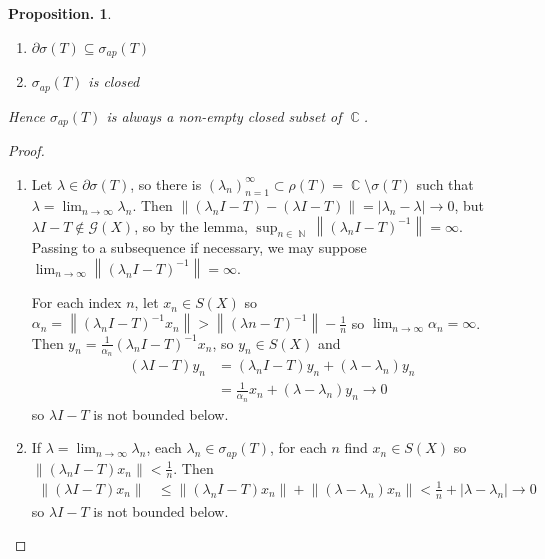 \documentclass[11pt, a4paper]{memoir}
\DeclareMathOperator{\N}{{\mathbb{N}}}
\DeclareMathOperator{\C}{{\mathbb{C}}}
\newcommand{\norm}[1]{\ensuremath{\left\lVert#1\right\rVert}}
\theoremstyle{change}
\newtheorem{proposition}[theorem]{Proposition.}
\theoremstyle{plain}
\theoremstyle{nonumberplain}
\newtheorem{proof}{Proof}
\numberwithin{equation}{section}
\begin{document}
\begin{proposition}
    \begin{enumerate}[nl,r]
        \item $\partial\sigma(T)\subseteq\sigma_{ap}(T)$
        \item $\sigma_{ap}(T)$ is closed
    \end{enumerate}
    Hence $\sigma_{ap}(T)$ is always a non-empty closed subset of $\C$.
\end{proposition}
\begin{proof}
    \begin{enumerate}[nl,r]
        \item Let $\lambda\in\partial\sigma(T)$, so there is $(\lambda_n)_{n=1}^\infty\subset\rho(T)=\C\setminus\sigma(T)$ such that $\lambda=\lim_{n\to\infty}\lambda_n$.
            Then $\norm{(\lambda_nI-T)-(\lambda I-T)}=|\lambda_n-\lambda|\to 0$, but $\lambda I-T\notin\mathcal{G}(X)$, so by the lemma, $\sup_{n\in\N}\norm{(\lambda_nI-T)^{-1}}=\infty$.
            Passing to a subsequence if necessary, we may suppose $\lim_{n\to\infty}\norm{(\lambda_n I-T)^{-1}}=\infty$.

            For each index $n$, let $x_n\in S(X)$ so $\alpha_n=\norm{(\lambda_n I-T)^{-1}x_n}>\norm{(\lambda n-T)^{-1}}-\frac{1}{n}$ so $\lim_{n\to\infty}\alpha_n=\infty$.
            Then $y_n=\frac{1}{\alpha_n}(\lambda_n I-T)^{-1}x_n$, so $y_n\in S(X)$ and
            \begin{align*}
                (\lambda I-T)y_n&=(\lambda_n I-T)y_n+(\lambda-\lambda_n)y_n\\
                                &= \frac{1}{\alpha_n}x_n+(\lambda-\lambda_n)y_n\to 0
            \end{align*}
            so $\lambda I-T$ is not bounded below.
        \item If $\lambda=\lim_{n\to\infty}\lambda_n$, each $\lambda_n\in\sigma_{ap}(T)$, for each $n$ find $x_n\in S(X)$ so $\norm{(\lambda_n I-T)x_n}<\frac{1}{n}$.
            Then
            \begin{align*}
                \norm{(\lambda I-T)x_n} &\leq\norm{(\lambda_n I-T)x_n}+\norm{(\lambda-\lambda_n)x_n}<\frac{1}{n}+|\lambda-\lambda_n|\to 0
            \end{align*}
            so $\lambda I-T$ is not bounded below.
    \end{enumerate}
\end{proof}
\end{document}
